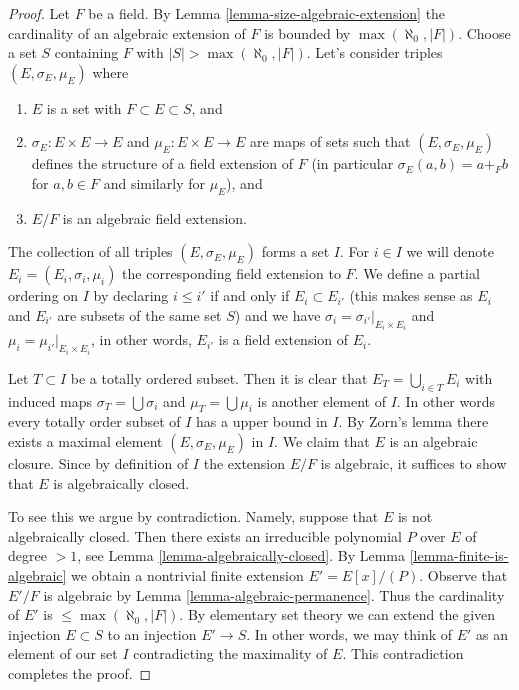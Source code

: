 \documentclass[10pt,a4paper]{amsart}
\theoremstyle{plain}
\theoremstyle{definition}
\theoremstyle{remark}
\numberwithin{equation}{subsection}
\begin{document}
\begin{proof}
Let $F$ be a field. By Lemma \ref{lemma-size-algebraic-extension} the
cardinality of an algebraic extension of $F$ is bounded by
$\max(\aleph_0, |F|)$. Choose a set $S$ containing $F$ with
$|S| > \max(\aleph_0, |F|)$. Let's consider triples
$(E, \sigma_E, \mu_E)$ where
\begin{enumerate}
\item $E$ is a set with $F \subset E \subset S$, and
\item $\sigma_E : E \times E \to E$ and $\mu_E : E \times E \to E$
are maps of sets such that $(E, \sigma_E, \mu_E)$ defines the structure
of a field extension of $F$ (in particular $\sigma_E(a, b) = a +_F b$
for $a, b \in F$ and similarly for $\mu_E$), and
\item $E/F$ is an algebraic field extension.
\end{enumerate}
The collection of all triples $(E, \sigma_E, \mu_E)$ forms a set $I$.
For $i \in I$ we will denote $E_i = (E_i, \sigma_i, \mu_i)$ the
corresponding field extension to $F$. We define a partial ordering on
$I$ by declaring $i \leq i'$ if and only if $E_i \subset E_{i'}$
(this makes sense as $E_i$ and $E_{i'}$ are subsets of the same set $S$)
and we have $\sigma_i = \sigma_{i'}|_{E_i \times E_i}$ and
$\mu_i = \mu_{i'}|_{E_i \times E_i}$, in other words, $E_{i'}$ is a field
extension of $E_i$.

\medskip\noindent
Let $T \subset I$ be a totally ordered subset. Then it is clear that
$E_T = \bigcup_{i \in T} E_i$ with induced maps $\sigma_T = \bigcup \sigma_i$
and $\mu_T = \bigcup \mu_i$ is another element of $I$. In other words
every totally order subset of $I$ has a upper bound in $I$. By Zorn's lemma
there exists a maximal element $(E, \sigma_E, \mu_E)$ in $I$. We claim that
$E$ is an algebraic closure. Since by definition of $I$ the extension
$E/F$ is algebraic, it suffices to show that $E$ is algebraically closed.

\medskip\noindent
To see this we argue by contradiction. Namely, suppose that $E$ is not
algebraically closed. Then there exists an irreducible polynomial
$P$ over $E$ of degree $> 1$, see Lemma \ref{lemma-algebraically-closed}.
By Lemma \ref{lemma-finite-is-algebraic} we obtain a nontrivial finite
extension $E' = E[x]/(P)$. Observe that $E'/F$ is algebraic by
Lemma \ref{lemma-algebraic-permanence}.
Thus the cardinality of $E'$ is $\leq \max(\aleph_0, |F|)$.
By elementary set theory we can extend the given injection
$E \subset S$ to an injection $E' \to S$. In other words, we may
think of $E'$ as an element of our set $I$ contradicting the
maximality of $E$. This contradiction completes the proof.
\end{proof}
\end{document}
